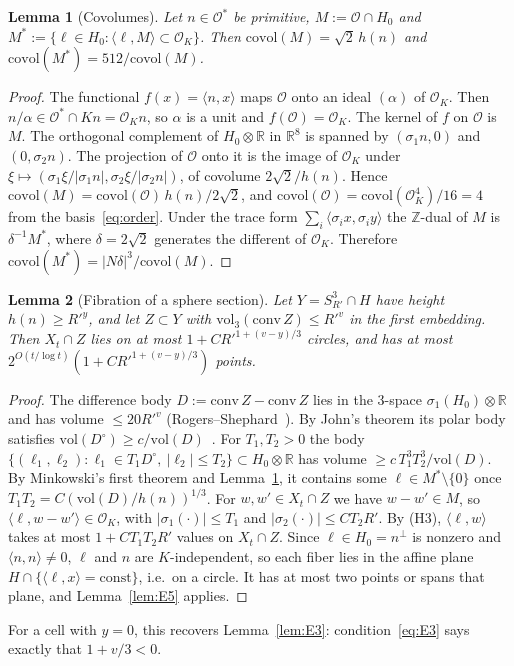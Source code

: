 \documentclass[aps,prx,twocolumn,superscriptaddress,nofootinbib,longbibliography]{revtex4-2}
\theoremstyle{plain}
\newtheorem{lemma}{Lemma}
\theoremstyle{definition}
\theoremstyle{remark}
\newcommand{\Z}{\mathbb{Z}}
\newcommand{\R}{\mathbb{R}}
\begin{document}
\begin{lemma}[Covolumes]\label{lem:F1}
Let $n\in\mathcal O^*$ be primitive, $M:=\mathcal O\cap H_0$ and $M^*:=\{\ell\in H_0:\langle\ell,M\rangle\subset\mathcal O_K\}$. Then $\mathrm{covol}(M)=\sqrt2\,h(n)$ and $\mathrm{covol}(M^*)=512/\mathrm{covol}(M)$.
\end{lemma}
\begin{proof}
The functional $f(x)=\langle n,x\rangle$ maps $\mathcal O$ onto an ideal $(\alpha)$ of $\mathcal O_K$. Then $n/\alpha\in\mathcal O^*\cap Kn=\mathcal O_Kn$, so $\alpha$ is a unit and $f(\mathcal O)=\mathcal O_K$. The kernel of $f$ on $\mathcal O$ is $M$. The orthogonal complement of $H_0\otimes\R$ in $\R^8$ is spanned by $(\sigma_1n,0)$ and $(0,\sigma_2n)$. The projection of $\mathcal O$ onto it is the image of $\mathcal O_K$ under $\xi\mapsto(\sigma_1\xi/|\sigma_1n|,\sigma_2\xi/|\sigma_2n|)$, of covolume $2\sqrt2/h(n)$. Hence $\mathrm{covol}(M)=\mathrm{covol}(\mathcal O)\,h(n)/2\sqrt2$, and $\mathrm{covol}(\mathcal O)=\mathrm{covol}(\mathcal O_K^4)/16=4$ from the basis~\eqref{eq:order}. Under the trace form $\sum_i\langle\sigma_ix,\sigma_iy\rangle$ the $\Z$-dual of $M$ is $\delta^{-1}M^*$, where $\delta=2\sqrt2$ generates the different of $\mathcal O_K$. Therefore $\mathrm{covol}(M^*)=|N\delta|^3/\mathrm{covol}(M)$.
\end{proof}

\begin{lemma}[Fibration of a sphere section]\label{lem:F2}
Let $Y=S^3_{R'}\cap H$ have height $h(n)\ge R'^y$, and let $Z\subset Y$ with $\mathrm{vol}_3(\mathrm{conv}\,Z)\le R'^v$ in the first embedding. Then $X_t\cap Z$ lies on at most $1+CR'^{1+(v-y)/3}$ circles, and has at most $2^{O(t/\log t)}(1+CR'^{1+(v-y)/3})$ points.
\end{lemma}
\begin{proof}
The difference body $D:=\mathrm{conv}\,Z-\mathrm{conv}\,Z$ lies in the $3$-space $\sigma_1(H_0)\otimes\R$ and has volume $\le20R'^v$ (Rogers--Shephard~\cite{RogersShephard}). By John's theorem its polar body satisfies $\mathrm{vol}(D^\circ)\ge c/\mathrm{vol}(D)$~\cite{Gruber}. For $T_1,T_2>0$ the body $\{(\ell_1,\ell_2):\ell_1\in T_1D^\circ,\ |\ell_2|\le T_2\}\subset H_0\otimes\R$ has volume $\ge c\,T_1^3T_2^3/\mathrm{vol}(D)$. By Minkowski's first theorem and Lemma~\ref{lem:F1}, it contains some $\ell\in M^*\setminus\{0\}$ once $T_1T_2=C(\mathrm{vol}(D)/h(n))^{1/3}$. For $w,w'\in X_t\cap Z$ we have $w-w'\in M$, so $\langle\ell,w-w'\rangle\in\mathcal O_K$, with $|\sigma_1(\cdot)|\le T_1$ and $|\sigma_2(\cdot)|\le CT_2R'$. By (H3), $\langle\ell,w\rangle$ takes at most $1+CT_1T_2R'$ values on $X_t\cap Z$. Since $\ell\in H_0=n^\perp$ is nonzero and $\langle n,n\rangle\ne0$, $\ell$ and $n$ are $K$-independent, so each fiber lies in the affine plane $H\cap\{\langle\ell,x\rangle=\mathrm{const}\}$, i.e.\ on a circle. It has at most two points or spans that plane, and Lemma~\ref{lem:E5} applies.
\end{proof}
For a cell with $y=0$, this recovers Lemma~\ref{lem:E3}: condition~\eqref{eq:E3} says exactly that $1+v/3<0$.
\end{document}
